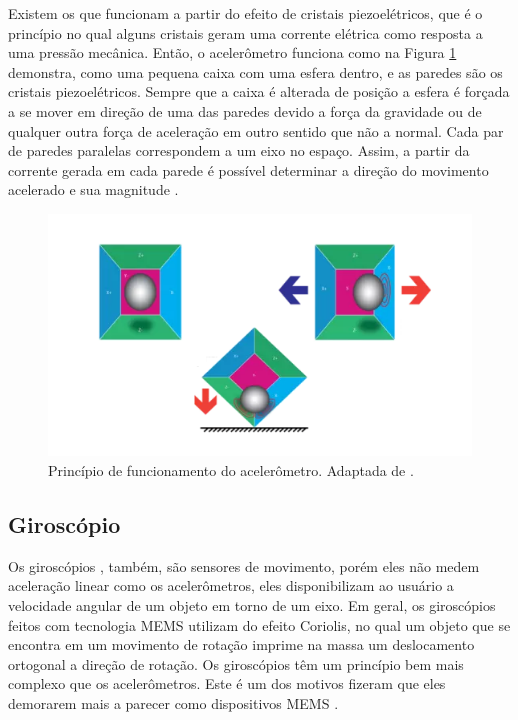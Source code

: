 				Existem os que funcionam a partir do efeito de cristais piezoelétricos, que é o princípio no qual alguns cristais geram uma corrente elétrica como resposta a uma pressão mecânica. Então, o acelerômetro  funciona como na Figura \ref{acel} demonstra, como uma pequena caixa com uma esfera dentro, e as paredes são os cristais piezoelétricos.  Sempre que a caixa é alterada de posição a esfera é forçada a se mover em direção de uma das paredes devido a força da gravidade ou de qualquer outra força de aceleração em outro sentido que não a normal. Cada par de paredes paralelas correspondem a um eixo no espaço. Assim, a partir da corrente gerada em cada parede é possível determinar a direção do movimento acelerado e sua magnitude \cite{Sanjeev2018}.
				
				\begin{figure}[h!]
					\centering
					\includegraphics[keepaspectratio=true,scale=0.8
					]{figuras/acelerometro.PNG}
					\caption{Princípio de funcionamento do acelerômetro. Adaptada de .}
					
					\label{acel}
				\end{figure}
	
		\subsection{Giroscópio}
			
			Os giroscópios , também, são sensores de movimento, porém eles não medem aceleração linear como os acelerômetros, eles disponibilizam ao usuário a velocidade angular de um objeto em torno de um eixo. Em geral, os giroscópios feitos com tecnologia MEMS utilizam do efeito Coriolis, no qual um objeto que se encontra em um movimento de rotação imprime na massa um deslocamento ortogonal a direção de rotação. Os giroscópios têm um princípio bem mais complexo que os acelerômetros. Este é um dos motivos fizeram que eles demorarem mais a parecer como dispositivos MEMS \cite{almeida2014}.
			
